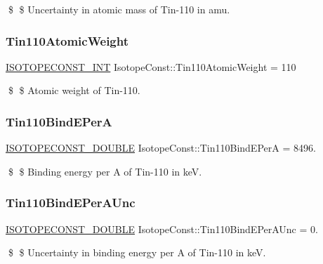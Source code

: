 \$ \$ Uncertainty in atomic mass of Tin-\/110 in amu. \mbox{\label{group___isotope_const-_tin-_sn110_ga7f3c9dbd41960a788af23739436e14f4}} 
\subsubsection{\texorpdfstring{Tin110\+Atomic\+Weight}{Tin110AtomicWeight}}
{\footnotesize\ttfamily \mbox{\hyperlink{group___isotope_const-_macros_ga5f18360b3e99483a35c32d789e62621c}{I\+S\+O\+T\+O\+P\+E\+C\+O\+N\+S\+T\+\_\+\+I\+NT}} Isotope\+Const\+::\+Tin110\+Atomic\+Weight = 110}

\$ \$ Atomic weight of Tin-\/110. \mbox{\label{group___isotope_const-_tin-_sn110_ga7c9bdc321196b941e2bd55036bf8f2c9}} 
\subsubsection{\texorpdfstring{Tin110\+Bind\+E\+PerA}{Tin110BindEPerA}}
{\footnotesize\ttfamily \mbox{\hyperlink{group___isotope_const-_macros_ga8f45a7272ce02c0b4c65c44636ed719a}{I\+S\+O\+T\+O\+P\+E\+C\+O\+N\+S\+T\+\_\+\+D\+O\+U\+B\+LE}} Isotope\+Const\+::\+Tin110\+Bind\+E\+PerA = 8496.}

\$ \$ Binding energy per A of Tin-\/110 in keV. \mbox{\label{group___isotope_const-_tin-_sn110_ga1d44fa9dc4a14df751196ece4b6556ec}} 
\subsubsection{\texorpdfstring{Tin110\+Bind\+E\+Per\+A\+Unc}{Tin110BindEPerAUnc}}
{\footnotesize\ttfamily \mbox{\hyperlink{group___isotope_const-_macros_ga8f45a7272ce02c0b4c65c44636ed719a}{I\+S\+O\+T\+O\+P\+E\+C\+O\+N\+S\+T\+\_\+\+D\+O\+U\+B\+LE}} Isotope\+Const\+::\+Tin110\+Bind\+E\+Per\+A\+Unc = 0.}

\$ \$ Uncertainty in binding energy per A of Tin-\/110 in keV. \mbox{\label{group___isotope_const-_tin-_sn110_ga8d37d1879ad1b71aa2de8b617d2e56da}} 
